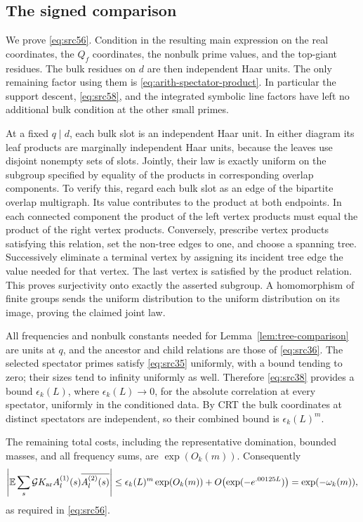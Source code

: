 \subsection{The signed comparison}

We prove \eqref{eq:src56}. Condition in the resulting main expression on
the real coordinates, the $Q_f$ coordinates, the nonbulk prime values, and
the top-giant residues. The bulk residues on $d$ are then independent
Haar units. The only remaining factor using them is
\eqref{eq:arith-spectator-product}. In particular the support descent,
\eqref{eq:src58}, and the integrated symbolic line factors have left no
additional bulk condition at the other small primes.

At a fixed $q\mid d$, each bulk slot is an independent Haar unit. In either
diagram its leaf products are marginally independent Haar units, because
the leaves use disjoint nonempty sets of slots. Jointly, their law is exactly
uniform on the subgroup specified by equality of the products in
corresponding overlap components. To verify this, regard each bulk slot as
an edge of the bipartite overlap multigraph. Its value contributes to the
product at both endpoints. In each connected component the product of the
left vertex products must equal the product of the right vertex products.
Conversely, prescribe vertex products satisfying this relation, set the
non-tree edges to one, and choose a spanning tree. Successively eliminate a
terminal vertex by assigning its incident tree edge the value needed for
that vertex. The last vertex is satisfied by the product relation. This
proves surjectivity onto exactly the asserted subgroup. A homomorphism of
finite groups sends the uniform distribution to the uniform distribution
on its image, proving the claimed joint law.

All frequencies and nonbulk constants needed for
Lemma~\ref{lem:tree-comparison} are units at $q$, and the ancestor and child
relations are those of \eqref{eq:src36}. The selected spectator primes
satisfy \eqref{eq:src35} uniformly, with a bound tending to zero; their
sizes tend to infinity uniformly as well. Therefore \eqref{eq:src38}
provides a bound $\epsilon_k(L)$, where $\epsilon_k(L)\to0$, for the
absolute correlation at every spectator, uniformly in the conditioned
data. By CRT the bulk coordinates at distinct spectators are independent,
so their combined bound is $\epsilon_k(L)^m$.

The remaining total costs, including the representative domination,
bounded masses, and all frequency sums, are $\exp(O_k(m))$. Consequently
\[
 \left|\mathbb E\sum_s\mathcal G K_{\rm ar}
                   A_l^{(1)}(s)\overline{A_l^{(2)}(s)}\right|
 \leq \epsilon_k(L)^m\exp(O_k(m))
       +O\bigl(\exp(-e^{.00125L})\bigr)
 =\exp(-\omega_k(m)),
\]
as required in \eqref{eq:src56}.

